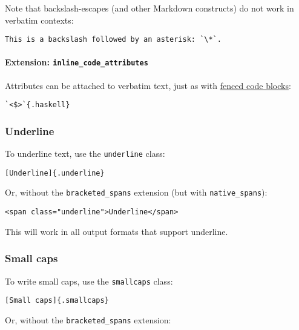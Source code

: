 \documentclass[
  a4paper,
]{article}
\begin{document}
Note that backslash-escapes (and other Markdown constructs) do not work
in verbatim contexts:

\begin{verbatim}
This is a backslash followed by an asterisk: `\*`.
\end{verbatim}

\hypertarget{extension-inline_code_attributes}{%
\paragraph{\texorpdfstring{Extension:
\texttt{inline\_code\_attributes}}{Extension: inline\_code\_attributes}}\label{extension-inline_code_attributes}}

Attributes can be attached to verbatim text, just as with
\protect\hyperlink{fenced-code-blocks}{fenced code blocks}:

\begin{verbatim}
`<$>`{.haskell}
\end{verbatim}

\hypertarget{underline}{%
\subsubsection{Underline}\label{underline}}

To underline text, use the \texttt{underline} class:

\begin{verbatim}
[Underline]{.underline}
\end{verbatim}

Or, without the \texttt{bracketed\_spans} extension (but with
\texttt{native\_spans}):

\begin{verbatim}
<span class="underline">Underline</span>
\end{verbatim}

This will work in all output formats that support underline.

\hypertarget{small-caps}{%
\subsubsection{Small caps}\label{small-caps}}

To write small caps, use the \texttt{smallcaps} class:

\begin{verbatim}
[Small caps]{.smallcaps}
\end{verbatim}

Or, without the \texttt{bracketed\_spans} extension:
\end{document}
